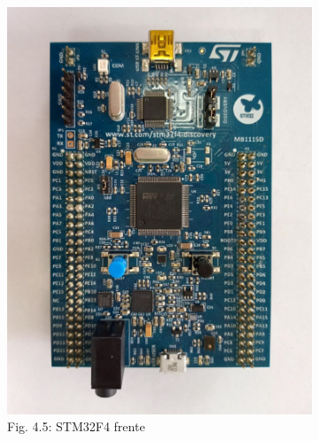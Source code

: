 \documentclass[12pt]{article}
\begin{document}
\begin{figure}[ht]
  \centering
  \begin{subfigure}[b]{0.45\linewidth}
    \includegraphics[width=\linewidth]{images/STM32F4-1.jpg}
    \caption{Fig. 4.5: STM32F4 frente}
  \end{subfigure}
  \begin{subfigure}[b]{0.45\linewidth}

\end{subfigure}
\end{figure}
\end{document}
